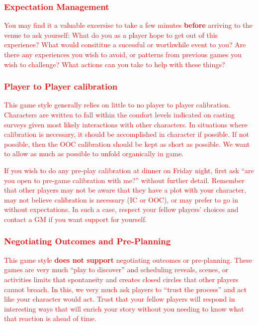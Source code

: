 \documentclass[sheet]{GL2020}
\begin{document}
\textcolor{red}{\subsubsection{Expectation Management}}
\textcolor{red}{You may find it a valuable excersise to take a few minutes \textbf{before} arriving to the venue to ask yourself: What do you as a player hope to get out of this experience? What would consititue a sucessful or worthwhile event to you? Are there any experiences you wish to avoid, or patterns from previous games you wish to challenge? What actions can you take to help with these things?}

\textcolor{red}{\subsubsection{Player to Player calibration}}
\textcolor{red}{This game style generally relies on little to no player to player calibration. Characters are written to fall within the comfort levels indicated on casting surveys given most likely interactions with other characters. In situations where calibration is necessary, it should be accomplished in character if possible. If not possible, then the OOC calibration should be kept as short as possible. We want to allow as much as possible to unfold organically in game.}

\textcolor{red}{If you wish to do any pre-play calibration at dinner on Friday night, first ask ``are you open to pre-game calibration with me?'' without further detail.  Remember that other players may not be aware that they have a plot with your character, may not believe calibration is necessary (IC or OOC), or may prefer to go in without expectations. In such a case, respect your fellow players' choices and contact a GM if you want support for yourself.}

\textcolor{red}{\subsubsection{Negotiating Outcomes and Pre-Planning}}
\textcolor{red}{This game style \textbf{does not support} negotiating outcomes or pre-planning. These games are very much ``play to discover'' and scheduling reveals, scenes, or activities limits that spontaneity and creates closed circles that other players cannot broach. In this, we very much ask players to ``trust the process'' and act like your character would act. Trust that your fellow players will respond in interesting ways that will enrich your story without you needing to know what that reaction is ahead of time.}
\end{document}
